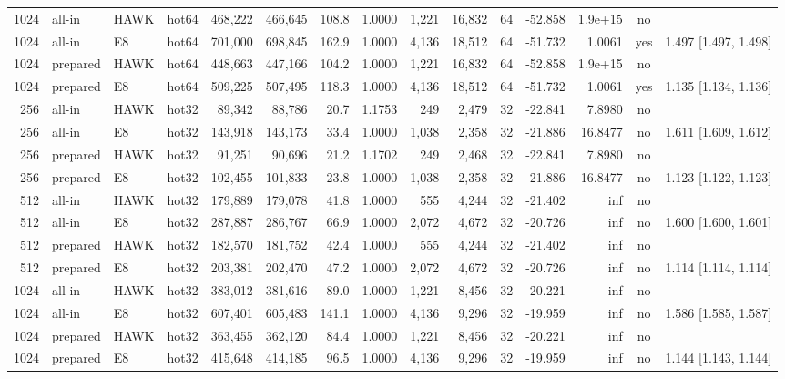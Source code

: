 \begin{table}[t]
{\begin{tabular}{rllcrrrrrrrrrcl}
1024 & all-in & HAWK & hot64 & 468{,}222 & 466{,}645 & 108.8 & 1.0000 & 1{,}221 & 16{,}832 & 64 & -52.858 & 1.9e+15 & no &  \\
1024 & all-in & E8 & hot64 & 701{,}000 & 698{,}845 & 162.9 & 1.0000 & 4{,}136 & 18{,}512 & 64 & -51.732 & 1.0061 & yes & 1.497 [1.497, 1.498] \\
1024 & prepared & HAWK & hot64 & 448{,}663 & 447{,}166 & 104.2 & 1.0000 & 1{,}221 & 16{,}832 & 64 & -52.858 & 1.9e+15 & no &  \\
1024 & prepared & E8 & hot64 & 509{,}225 & 507{,}495 & 118.3 & 1.0000 & 4{,}136 & 18{,}512 & 64 & -51.732 & 1.0061 & yes & 1.135 [1.134, 1.136] \\
256 & all-in & HAWK & hot32 & 89{,}342 & 88{,}786 & 20.7 & 1.1753 & 249 & 2{,}479 & 32 & -22.841 & 7.8980 & no &  \\
256 & all-in & E8 & hot32 & 143{,}918 & 143{,}173 & 33.4 & 1.0000 & 1{,}038 & 2{,}358 & 32 & -21.886 & 16.8477 & no & 1.611 [1.609, 1.612] \\
256 & prepared & HAWK & hot32 & 91{,}251 & 90{,}696 & 21.2 & 1.1702 & 249 & 2{,}468 & 32 & -22.841 & 7.8980 & no &  \\
256 & prepared & E8 & hot32 & 102{,}455 & 101{,}833 & 23.8 & 1.0000 & 1{,}038 & 2{,}358 & 32 & -21.886 & 16.8477 & no & 1.123 [1.122, 1.123] \\
512 & all-in & HAWK & hot32 & 179{,}889 & 179{,}078 & 41.8 & 1.0000 & 555 & 4{,}244 & 32 & -21.402 & inf & no &  \\
512 & all-in & E8 & hot32 & 287{,}887 & 286{,}767 & 66.9 & 1.0000 & 2{,}072 & 4{,}672 & 32 & -20.726 & inf & no & 1.600 [1.600, 1.601] \\
512 & prepared & HAWK & hot32 & 182{,}570 & 181{,}752 & 42.4 & 1.0000 & 555 & 4{,}244 & 32 & -21.402 & inf & no &  \\
512 & prepared & E8 & hot32 & 203{,}381 & 202{,}470 & 47.2 & 1.0000 & 2{,}072 & 4{,}672 & 32 & -20.726 & inf & no & 1.114 [1.114, 1.114] \\
1024 & all-in & HAWK & hot32 & 383{,}012 & 381{,}616 & 89.0 & 1.0000 & 1{,}221 & 8{,}456 & 32 & -20.221 & inf & no &  \\
1024 & all-in & E8 & hot32 & 607{,}401 & 605{,}483 & 141.1 & 1.0000 & 4{,}136 & 9{,}296 & 32 & -19.959 & inf & no & 1.586 [1.585, 1.587] \\
1024 & prepared & HAWK & hot32 & 363{,}455 & 362{,}120 & 84.4 & 1.0000 & 1{,}221 & 8{,}456 & 32 & -20.221 & inf & no &  \\
1024 & prepared & E8 & hot32 & 415{,}648 & 414{,}185 & 96.5 & 1.0000 & 4{,}136 & 9{,}296 & 32 & -19.959 & inf & no & 1.144 [1.143, 1.144] \\

\end{tabular}}
\end{table}

